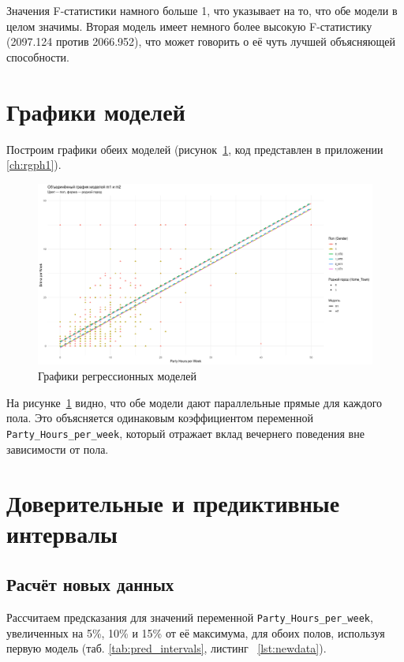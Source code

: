 Значения F-статистики намного больше 1, что указывает на то, что обе модели в целом значимы.
Вторая модель имеет немного более высокую F-статистику (2097.124 против 2066.952), что может говорить о её чуть лучшей объясняющей способности.

\section{Графики моделей}

Построим графики обеих моделей (рисунок~\ref{fig:models}, код представлен в приложении \ref{ch:rgph1}).


\begin{figure}[h]
	\centering
	\includegraphics[height=0.6\textwidth]{imgs/models.png}
	\caption{Графики регрессионных моделей}
	\label{fig:models}
\end{figure}

На рисунке~\ref{fig:models} видно, что обе модели дают параллельные прямые для каждого пола. Это объясняется одинаковым коэффициентом переменной \texttt{Party\_Hours\_per\_week}, который отражает вклад вечернего поведения вне зависимости от пола.




\section{Доверительные и предиктивные интервалы}
\subsection*{Расчёт новых данных}
Рассчитаем предсказания для значений переменной \texttt{Party\_Hours\_per\_week}, увеличенных на 5\%, 10\% и 15\% от её максимума, для обоих полов, используя первую модель (таб. \ref{tab:pred_intervals}, листинг~ \ref{lst:newdata}).

